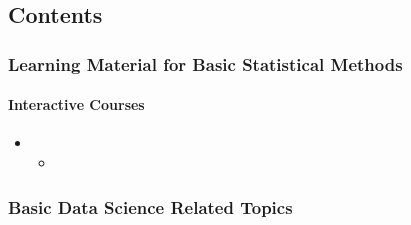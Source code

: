 \documentclass[letterpaper,10pt,english]{sphinxmanual}
\begin{document}
\subsection{Contents}
\label{\detokenize{stats_data_ml:contents}}

\subsubsection{Learning Material for Basic Statistical Methods}
\label{\detokenize{resource/research/stats_basic:learning-material-for-basic-statistical-methods}}\label{\detokenize{resource/research/stats_basic::doc}}

\paragraph{Interactive Courses}
\label{\detokenize{resource/research/stats_basic:interactive-courses}}\begin{itemize}
\item {} 
\begin{itemize}
\item {} 

\end{itemize}

\end{itemize}


\subsubsection{Basic Data Science Related Topics}
\label{\detokenize{resource/research/data_science:basic-data-science-related-topics}}\label{\detokenize{resource/research/data_science::doc}}
\end{document}
